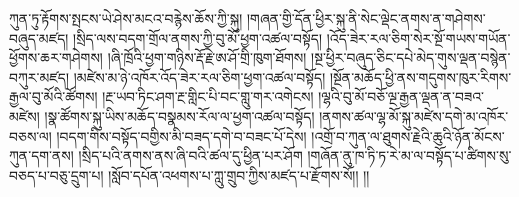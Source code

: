 ཀུན་ཏུ་རྟོགས་སྤངས་ཡེ་ཤེས་མངའ་བརྙེས་ཆོས་ཀྱི་སྐུ། །གཞན་གྱི་དོན་ཕྱིར་སྐུ་ནི་སེང་ལྡེང་ནགས་ན་གཤེགས་བཞུད་མཛད། །སྲིད་ལས་བདག་གྲོལ་ནགས་ཀྱི་བུ་མོ་ཕྱག་འཚལ་བསྟོད། །འོད་ཟེར་རལ་ཅིག་སེར་སྔོ་གཡས་གཡོན་ཕྱོགས་ཆར་གཤེགས། །ཞི་ཁྲོའི་ཕྱག་གཉིས་རྡོ་རྗེ་ཨ་ཤོ་གྲི་ཁུག་ཐོགས། །སྔ་ཕྱིར་བཞུད་ཅིང་དཔེ་མེད་གུས་ལྡན་བསྙེན་བཀུར་མཛད། །མཛེས་མ་ཉེ་འཁོར་འོད་ཟེར་རལ་ཅིག་ཕྱག་འཚལ་བསྟོད། །སྔོན་མཆོད་ཕྱི་ནས་གདུགས་ཁུར་རིགས་རྒྱལ་བུ་མོའི་ཚོགས། །རྔ་ཡབ་ཏིང་ཤག་རྔ་གླིང་པི་བང་གླུ་གར་འགེངས། །ལྷའི་བུ་མོ་བཅོ་ལྔ་རྒྱན་ལྡན་ན་བཟའ་མཛེས། །སྣ་ཚོགས་སྐུ་ཡིས་མཆོད་བསྣམས་རོལ་ལ་ཕྱག་འཚལ་བསྟོད། །ནགས་ཚལ་ལྷ་མོ་སྐུ་མཛེས་དགེ་མ་འཁོར་བཅས་ལ། །བདག་གིས་བསྟོད་བགྱིས་མི་བཟད་དགེ་བ་བཟང་པོ་དེས། །འགྲོ་བ་ཀུན་ལ་ཐུགས་རྗེའི་ཆུའི་ཉོན་མོངས་ཀུན་དག་ནས། །སྲིད་པའི་ནགས་ནས་ཞི་བའི་ཚལ་དུ་ཕྱིན་པར་ཤོག །གཞོན་ནུ་ཁ་ཏི་ཏ་རེ་མ་ལ་བསྟོད་པ་ཚིགས་སུ་བཅད་པ་བཅུ་དྲུག་པ། །སློབ་དཔོན་འཕགས་པ་ཀླུ་གྲུབ་ཀྱིས་མཛད་པ་རྫོགས་སོ།། །།